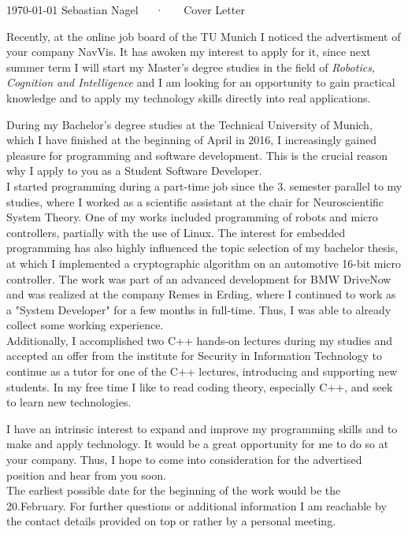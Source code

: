 \documentclass[12pt, a4paper]{awesome-cv}
\begin{document}
\makecvheader

\makecvfooter
  {\today}
  {Sebastian Nagel~~~·~~~ Cover Letter}
  {}

\medskip
\makelettertitle

%
%
\begin{cvletter}

Recently, at the online job board of the TU Munich I noticed the advertisment of your company NavVis. It has awoken my interest to apply for it, since next summer term I will start my Master's degree studies in the field of \textit{Robotics, Cognition and Intelligence} and I am looking for an opportunity to gain practical knowledge and to apply my technology skills directly into real applications. 

During my Bachelor's degree studies at the Technical University of Munich, which I have finished at the beginning of April in 2016, I increasingly gained pleasure for programming and software development. This is the crucial reason why I apply to you as a Student Software Developer. 
\\I started programming during a part-time job since the 3. semester parallel to my studies, where I worked as a scientific assistant at the chair for Neuroscientific System Theory. One of my works included programming of robots and micro controllers, partially with the use of Linux. The interest for embedded programming has also highly influenced the topic selection of my bachelor thesis, at which I implemented a cryptographic algorithm on an automotive 16-bit micro controller. The work was part of an advanced development for BMW DriveNow and was realized at the company Remes in Erding, where I continued to work as a "System Developer" for a few months in full-time. Thus, I was able to already collect some working experience.
\\Additionally, I accomplished two C++ hands-on lectures during my studies and accepted an offer from the institute for Security in Information Technology to continue as a tutor for one of the C++ lectures, introducing and supporting new students. In my free time I like to read coding theory, especially C++, and seek to learn new technologies. 
    
I have an intrinsic interest to expand and improve my programming skills and to make and apply technology. It would be a great opportunity for me to do so at your company. Thus, I hope to come into consideration for the advertised position and hear from you soon.
\\The earliest possible date for the beginning of the work would be the 20.February. For further questions or additional information I am reachable by the contact details provided on top or rather by a personal meeting. 
\end{cvletter}


\makeletterclosing
\end{document}
